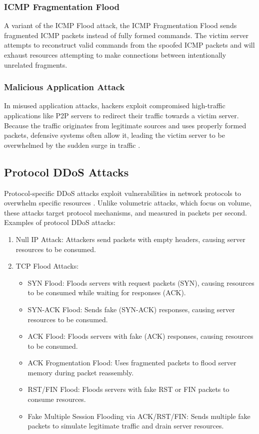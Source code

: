 \documentclass[a4paper, 12pt]{report} %
\begin{document}
\begin{table}[h!]
        \subsubsection{ICMP Fragmentation Flood}
        A variant of the ICMP Flood attack, the ICMP Fragmentation Flood sends fragmented ICMP packets instead of fully formed commands. The victim server attempts to reconstruct valid commands from the spoofed ICMP packets and will exhaust resources attempting to make connections between intentionally unrelated fragments.

        \subsubsection{Malicious Application Attack}
        In misused application attacks, hackers exploit compromised high-traffic applications like P2P servers to redirect their traffic towards a victim server. Because the traffic originates from legitimate sources and uses properly formed packets, defensive systems often allow it, leading the victim server to be overwhelmed by the sudden surge in traffic \cite{impervaDDoSAttack}.


        \subsection{Protocol DDoS Attacks}
        Protocol-specific DDoS attacks exploit vulnerabilities in network protocols to overwhelm specific resources . Unlike volumetric attacks, which focus on volume, these attacks target protocol mechanisms, and  measured in packets per second.
        Examples of protocol DDoS attacks:
        \begin{enumerate}
        \item Null IP Attack: Attackers send packets with empty headers, causing server resources to be consumed.
        \item TCP Flood Attacks:
        \begin{itemize}
            \item SYN Flood: Floods servers with request packets (SYN), causing resources to be consumed while waiting for responses (ACK).
            \item SYN-ACK Flood: Sends fake (SYN-ACK) responses, causing server resources to be consumed.
            \item ACK Flood: Floods servers with fake (ACK) responses, causing resources to be consumed.
            \item ACK Frogmentation Flood: Uses fragmented packets to flood server memory during packet reassembly.
            \item RST/FIN Flood: Floods servers with fake RST or FIN packets to consume resources.
            \item Fake Multiple Session Flooding via ACK/RST/FIN: Sends multiple fake packets to simulate legitimate traffic and drain server resources.
            

\end{itemize}
\end{enumerate}
\end{table}
\end{document}
